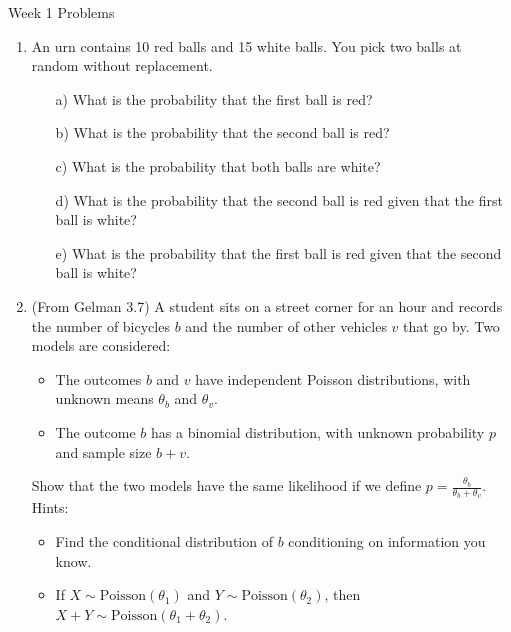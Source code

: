 \documentclass[10pt,a4paper]{article}
\author{Patrick Lam}
\begin{document}
\begin{center}
\begin{Large}Week 1 Problems\end{Large}
\end{center}
\bigskip
\begin{enumerate}

\item An urn contains 10 red balls and 15 white balls. You pick two balls at random without replacement. 

\begin{enumerate}
\item[a)] What is the probability that the first ball is red?

\item[b)] What is the probability that the second ball is red?

\item[c)] What is the probability that both balls are white?

\item[d)] What is the probability that the second ball is red given that the first ball is white?

\item[e)] What is the probability that the first ball is red given that the second ball is white?

\end{enumerate}

\bigskip

\item (From Gelman 3.7) A student sits on a street corner for an hour and records the number of bicycles $b$ and the number of other vehicles $v$ that go by.  Two models are considered:
\begin{itemize}
\item The outcomes $b$ and $v$ have independent Poisson distributions, with unknown means $\theta_b$ and $\theta_v$.
\item The outcome $b$ has a binomial distribution, with unknown probability $p$ and sample size $b + v$.
\end{itemize}
Show that the two models have the same likelihood if we define $p = \frac{\theta_b}{\theta_b + \theta_v}$. \\

Hints:
\begin{itemize}
\item Find the conditional distribution of $b$ conditioning on information you know.
\item If $X \sim \mathrm{Poisson}(\theta_1)$ and $Y \sim \mathrm{Poisson}(\theta_2)$, then $X+Y \sim \mathrm{Poisson}(\theta_1 + \theta_2)$.
\end{itemize}



\end{enumerate}
\end{document}
